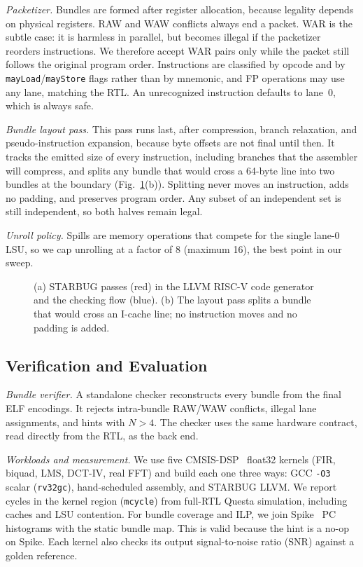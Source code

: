 \documentclass[conference]{IEEEtran}
\begin{document}
\emph{Packetizer.} Bundles are formed after register allocation, because legality depends on physical registers. RAW and WAW conflicts always end a packet. WAR is the subtle case: it is harmless in parallel, but becomes illegal if the packetizer reorders instructions. We therefore accept WAR pairs only while the packet still follows the original program order. Instructions are classified by opcode and by \texttt{mayLoad}/\texttt{mayStore} flags rather than by mnemonic, and FP operations may use any lane, matching the RTL. An unrecognized instruction defaults to lane~0, which is always safe.

\emph{Bundle layout pass.} This pass runs last, after compression, branch relaxation, and pseudo-instruction expansion, because byte offsets are not final until then. It tracks the emitted size of every instruction, including branches that the assembler will compress, and splits any bundle that would cross a 64-byte line into two bundles at the boundary (Fig.~\ref{fig:compiler}(b)). Splitting never moves an instruction, adds no padding, and preserves program order. Any subset of an independent set is still independent, so both halves remain legal.

\emph{Unroll policy.} Spills are memory operations that compete for the single lane-0 LSU, so we cap unrolling at a factor of 8 (maximum 16), the best point in our sweep.

\begin{figure}[t]
\centering
\resizebox{\columnwidth}{!}{}
\caption{(a) STARBUG passes (red) in the LLVM RISC-V code generator and the checking flow (blue). (b) The layout pass splits a bundle that would cross an I-cache line; no instruction moves and no padding is added.}
\label{fig:compiler}
\end{figure}

\subsection{Verification and Evaluation}
\emph{Bundle verifier.} A standalone checker reconstructs every bundle from the final ELF encodings. It rejects intra-bundle RAW/WAW conflicts, illegal lane assignments, and hints with $N>4$. The checker uses the same hardware contract, read directly from the RTL, as the back end.

\emph{Workloads and measurement.} We use five CMSIS-DSP~\cite{cmsis-dsp} float32 kernels (FIR, biquad, LMS, DCT-IV, real FFT) and build each one three ways: GCC \texttt{-O3} scalar (\texttt{rv32gc}), hand-scheduled assembly, and STARBUG LLVM. We report cycles in the kernel region (\texttt{mcycle}) from full-RTL Questa simulation, including caches and LSU contention. For bundle coverage and ILP, we join Spike~\cite{spike} PC histograms with the static bundle map. This is valid because the hint is a no-op on Spike. Each kernel also checks its output signal-to-noise ratio (SNR) against a golden reference.
\end{document}
